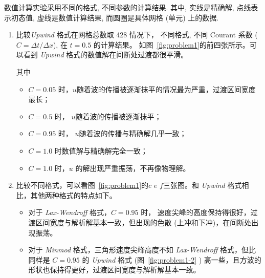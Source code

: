 \documentclass[10.5pt
]{article}
\begin{document}
数值计算实验采用不同的格式, 不同参数的计算结果.
其中, 实线是精确解, 点线表示初态值, 虚线是数值计算结果, 而圆圈是具体网格 (单元) 上的数据. 

\begin{enumerate}
    \item 比较\textit{Upwind} 格式在网格总数取 428 情况下，
        不同格式, 不同 Courant 系数 ($C = \Delta t / \Delta x$), 在 $t = 0.5$ 的计算结果。
        如图~\ref{fig:problem1}的前四张所示。可以看到 \textit{Upwind} 格式的数值解在间断处过渡都很平滑。

        其中
\begin{itemize}
	\item $C = 0.05$ 时，$u$随着波的传播被逐渐抹平的情况最为严重，过渡区间宽度最长；
	\item $C = 0.5$ 时， $u$随着波的传播被逐渐抹平；
	\item $C = 0.95$ 时， $u$随着波的传播与精确解几乎一致；
	\item $C = 1.0$ 时数值解与精确解完全一致；
	\item $C = 1.0$ 时，$u$ 的解出现严重振荡，不再像物理解。
\end{itemize}

\item
    比较不同格式，可以看图~\ref{fig:problem1}的$c$ $e$ $f$三张图。和 \textit{Upwind} 格式相比，其他两种格式的特点如下。
\begin{itemize}
    \item 对于 \textit{Lax-Wendroff} 格式，$C=0.95$ 时， 速度尖峰的高度保持得很好，过渡区间宽度与解析解基本一致，但出现的色散 (上冲和下冲)，在间断处出现振荡。
    \item 对于 \textit{Minmod} 格式，三角形速度尖峰高度不如 \textit{Lax-Wendroff} 格式，但比同样是 $C = 0.95$ 的 \textit{Upwind} 格式 (图~\ref{fig:problem1-2} ) 高一些，且方波的形状也保持得更好，过渡区间宽度与解析解基本一致。
\end{itemize}
\end{enumerate}
\end{document}
